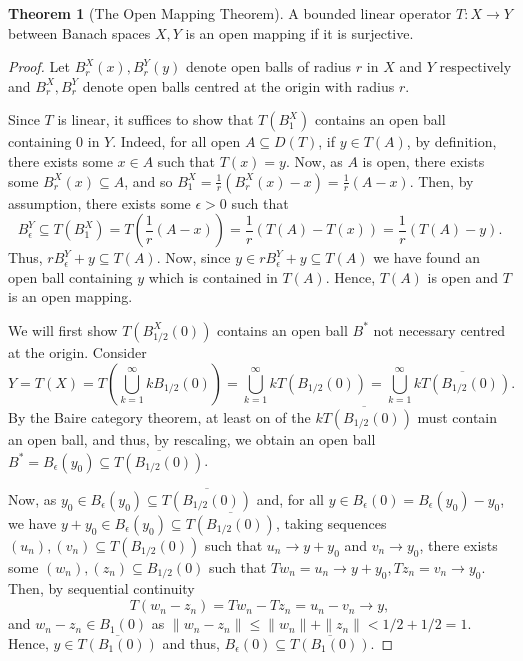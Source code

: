 \documentclass[]{article}
\theoremstyle{definition}
\newtheorem{theorem}{Theorem}
\theoremstyle{definition}
\begin{document}
\begin{theorem}[The Open Mapping Theorem]
  A bounded linear operator \(T : X \to Y\) between Banach spaces \(X, Y\) 
  is an open mapping if it is surjective.
\end{theorem}
\begin{proof}
  Let \(B^X_r(x), B^Y_r(y)\) denote open balls of radius \(r\) in \(X\) and \(Y\) 
  respectively and \(B^X_r, B^Y_r\) denote open balls centred at the origin with 
  radius \(r\). 
  
  Since \(T\) is linear, it suffices to show that \(T(B_1^X)\) contains an 
  open ball containing \(0\) in \(Y\). Indeed, for all open 
  \(A \subseteq D(T)\), if \(y \in T(A)\), by definition, there exists some 
  \(x \in A\) such that \(T(x) = y\). Now, as \(A\) is open, there exists some 
  \(B_r^X(x) \subseteq A\), and so 
  \(B^X_1 = \frac{1}{r} (B_r^X(x) - x) = \frac{1}{r} (A - x)\). Then, by assumption, 
  there exists some \(\epsilon > 0\) such that 
  \[B_\epsilon^Y \subseteq T(B_1^X) = T\left(\frac{1}{r}(A - x)\right) = 
    \frac{1}{r}(T(A) - T(x)) = \frac{1}{r}(T(A) - y).\]
  Thus, \(r B_\epsilon^Y + y \subseteq T(A)\). Now, since 
  \(y \in r B_\epsilon^Y + y \subseteq T(A)\) we have found an open ball 
  containing \(y\) which is contained in \(T(A)\). Hence, \(T(A)\) is open 
  and \(T\) is an open mapping.

  We will first show \(T(B^X_{1 / 2}(0))\) contains an open ball \(B^*\) not 
  necessary centred at the origin. Consider 
  \[Y = T(X) = T\left(\bigcup_{k = 1}^\infty k B_{1 / 2}(0)\right) 
    = \bigcup_{k = 1}^\infty k T(B_{1 / 2}(0))
    = \bigcup_{k = 1}^\infty \overline{k T(B_{1 / 2}(0))}.\]
  By the Baire category theorem, at least on of the 
  \(\overline{k T(B_{1 / 2}(0))}\) must contain an open ball, and thus, by 
  rescaling, we obtain an open ball \(B^* = B_\epsilon(y_0) 
  \subseteq \overline{T(B_{1 / 2}(0))}\). 
  
  Now, as \(y_0 \in B_\epsilon(y_0) \subseteq \overline{T(B_{1 / 2}(0))}\) 
  and, for all \(y \in B_\epsilon(0) = B_\epsilon(y_0) - y_0\), we have 
  \(y + y_0 \in B_\epsilon(y_0) \subseteq \overline{T(B_{1 / 2}(0))}\),
  taking sequences \((u_n), (v_n) \subseteq T(B_{1 / 2}(0))\) such that 
  \(u_n \to y + y_0\) and \(v_n \to y_0\), there 
  exists some \((w_n), (z_n) \subseteq B_{1 / 2}(0)\) such that 
  \(T w_n = u_n \to y + y_0, T z_n = v_n \to y_0\). Then, 
  by sequential continuity
  \[T(w_n - z_n) = T w_n - T z_n = u_n - v_n \to y,\]
  and \(w_n - z_n \in B_1(0)\) as \(\|w_n - z_n\| \le \|w_n\| + \|z_n\| 
  < 1 / 2 + 1 / 2 = 1\). Hence, \(y \in \overline{T(B_1(0))}\) and thus, 
  \(B_\epsilon(0) \subseteq \overline{T(B_1(0))}\).
  

\end{proof}
\end{document}
